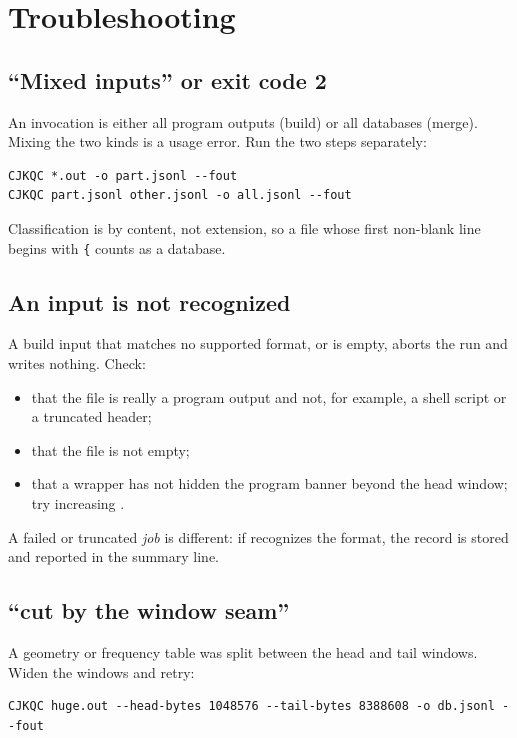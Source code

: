 \section{Troubleshooting}\label{app:troubleshooting}

\subsection{``Mixed inputs'' or exit code 2}

An invocation is either all program outputs (build) or all databases (merge).
Mixing the two kinds is a usage error. Run the two steps separately:

\begin{verbatim}
CJKQC *.out -o part.jsonl --fout
CJKQC part.jsonl other.jsonl -o all.jsonl --fout
\end{verbatim}

Classification is by content, not extension, so a file whose first non-blank
line begins with \texttt{\{} counts as a database.

\subsection{An input is not recognized}

A build input that matches no supported format, or is empty, aborts the run
and writes nothing. Check:

\begin{itemize}
  \item that the file is really a program output and not, for example, a
        shell script or a truncated header;
  \item that the file is not empty;
  \item that a wrapper has not hidden the program banner beyond the head
        window; try increasing .
\end{itemize}

A failed or truncated \emph{job} is different: if \CJKQC{} recognizes the
format, the record is stored and reported in the summary line.

\subsection{``cut by the window seam''}

A geometry or frequency table was split between the head and tail windows.
Widen the windows and retry:

\begin{verbatim}
CJKQC huge.out --head-bytes 1048576 --tail-bytes 8388608 -o db.jsonl --fout
\end{verbatim}

